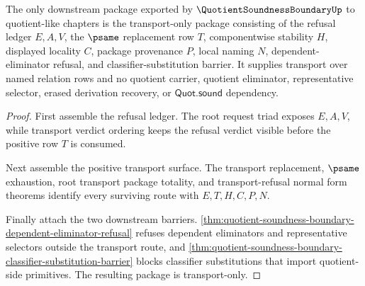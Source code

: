 \begin{theorem}
\label{thm:quotient-soundness-boundary-transport-only-downstream-package}
The only downstream package exported by $\QuotientSoundnessBoundaryUp$ to quotient-like chapters is the transport-only package consisting of the refusal ledger $E,A,V$, the $\psame$ replacement row $T$, componentwise stability $H$, displayed locality $C$, package provenance $P$, local naming $N$, dependent-eliminator refusal, and classifier-substitution barrier. It supplies transport over named relation rows and no quotient carrier, quotient eliminator, representative selector, erased derivation recovery, or $\mathsf{Quot.sound}$ dependency.
\end{theorem}
\begin{proof}
First assemble the refusal ledger. The root request triad exposes $E,A,V$, while transport verdict ordering keeps the refusal verdict visible before the positive row $T$ is consumed.

Next assemble the positive transport surface. The transport replacement, $\psame$ exhaustion, root transport package totality, and transport-refusal normal form theorems identify every surviving route with $E,T,H,C,P,N$.

Finally attach the two downstream barriers. \autoref{thm:quotient-soundness-boundary-dependent-eliminator-refusal} refuses dependent eliminators and representative selectors outside the transport route, and \autoref{thm:quotient-soundness-boundary-classifier-substitution-barrier} blocks classifier substitutions that import quotient-side primitives. The resulting package is transport-only.
\end{proof}
